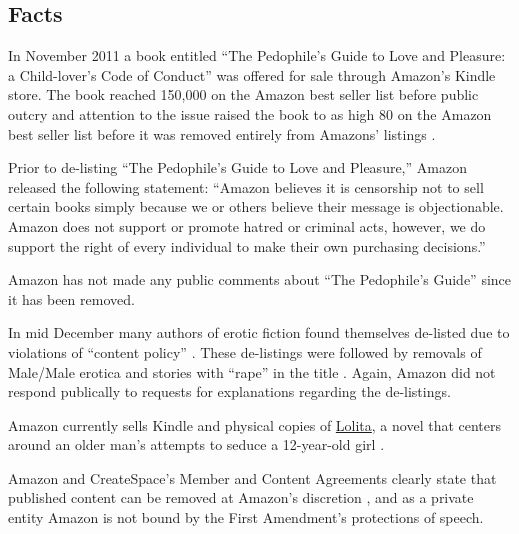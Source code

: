 \documentclass[11pt]{article}
\begin{document}
\thispagestyle{empty}  %
\tableofcontents

\newpage

\begin{multicols}{2}
\setcounter{page}{1}
\section{Facts}

In November 2011 a book entitled ``The Pedophile's Guide to Love and Pleasure: a Child-lover's Code of Conduct'' was offered for sale through Amazon's Kindle store.  The book reached 150,000 on the Amazon best seller list \cite{TechCrunchAmazonCensorship} before public outcry and attention to the issue raised the book to as high 80 on the Amazon best seller list before it was removed entirely from Amazons' listings \cite{TechCrunchAmazonPedophilia}.

Prior to de-listing ``The Pedophile's Guide to Love and Pleasure,'' Amazon released the following statement: ``Amazon believes it is censorship not to sell certain books simply because we or others believe their message is objectionable.  Amazon does not support or promote hatred or criminal acts, however, we do support the right of every individual to make their own purchasing decisions.'' \cite{TechCrunchAmazonCensorship}

Amazon has not made any public comments about ``The Pedophile's Guide'' since it has been removed.

In mid December many authors of erotic fiction found themselves de-listed due to violations of ``content policy'' \cite{KittSelfPubRevolution}.  These de-listings were followed by removals of Male/Male erotica and stories with ``rape'' in the title \cite{jamthecat}.  Again, Amazon did not respond publically to requests for explanations regarding the de-listings.  

Amazon currently sells Kindle and physical copies of \underline{Lolita}, a novel that centers around an older man's attempts to seduce a 12-year-old girl \cite{AmazonLolitaDTPListing}.

Amazon and CreateSpace's Member and Content Agreements clearly state that published content can be removed at Amazon's discretion \cite{CreateSpaceMemberAgreement,CreateSpaceContentGuidelines,AmazonKDPContentGuidelines}, and as a private entity Amazon is not bound by the First Amendment's protections of speech. 


\end{multicols}
\end{document}
